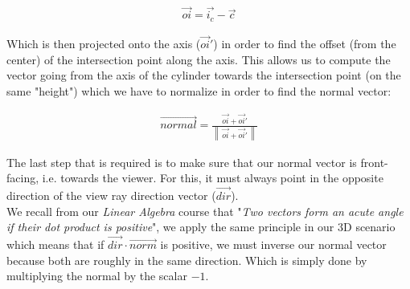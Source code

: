 \documentclass{article}
\newcommand{\norm}[1]{\left\lVert\,#1\,\right\rVert}
\newcommand{\vecb}[1]{\overrightarrow{#1}}
\begin{document}
    \begin{align*}
        \vecb{oi} = \vecb{i_c} - \vecb{c}
    \end{align*}

    Which is then projected onto the axis ($\vecb{oi}'$) in order to find the offset (from the center) of the intersection point along the axis.
    This allows us to compute the vector going from the axis of the cylinder towards the intersection point (on the same "height") which we have to normalize in order to find the normal vector:

    \begin{align*}
        \vecb{normal} = \frac{\vecb{oi} + \vecb{oi}'}{\norm{\vecb{oi} + \vecb{oi}'}}
    \end{align*}

    The last step that is required is to make sure that our normal vector is front-facing, i.e. towards the viewer.
    For this, it must always point in the opposite direction of the view ray direction vector ($\vecb{dir}$).\\

    We recall from our \textit{Linear Algebra} course that "\textit{Two vectors form an acute angle if their dot product is positive}", we apply the same principle in our 3D scenario which means that if $\vecb{dir} \cdot \vecb{norm}$ is positive, we must inverse our normal vector because both are roughly in the same direction.
    Which is simply done by multiplying the normal by the scalar $-1$.
\end{document}
